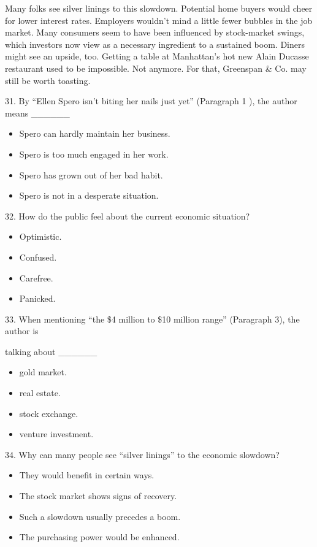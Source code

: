 \documentclass[UTF8,11pt]{ctexart}
\begin{document}
Many folks see silver linings to this slowdown. Potential home buyers would cheer for lower interest rates. Employers wouldn’t mind a little fewer bubbles in the job market. Many consumers seem to have been influenced by stock-market swings, which investors now view as a necessary ingredient to a sustained boom. Diners might see an upside, too. Getting a table at Manhattan’s hot new Alain Ducasse restaurant used to be impossible. Not anymore. For that, Greenspan \& Co. may still be worth toasting.


31. By “Ellen Spero isn’t biting her nails just yet” (Paragraph 1 ), the author means \_\_\_\_\_\_


\begin{itemize}[leftmargin=2em,itemsep=.2em,topsep=.4em]\item[A.] Spero can hardly maintain her business.
\item[B.] Spero is too much engaged in her work.
\item[C.] Spero has grown out of her bad habit.
\item[D.] Spero is not in a desperate situation.
\end{itemize}

32. How do the public feel about the current economic situation?


\begin{itemize}[leftmargin=2em,itemsep=.2em,topsep=.4em]\item[A.] Optimistic.
\item[B.] Confused.
\item[C.] Carefree.
\item[D.] Panicked.
\end{itemize}

33. When mentioning “the \$4 million to \$10 million range” (Paragraph 3), the author is


talking about \_\_\_\_\_\_


\begin{itemize}[leftmargin=2em,itemsep=.2em,topsep=.4em]\item[A.] gold market.
\item[B.] real estate.
\item[C.] stock exchange.
\item[D.] venture investment.
\end{itemize}

34. Why can many people see “silver linings” to the economic slowdown?


\begin{itemize}[leftmargin=2em,itemsep=.2em,topsep=.4em]\item[A.] They would benefit in certain ways.
\item[B.] The stock market shows signs of recovery.
\item[C.] Such a slowdown usually precedes a boom.
\item[D.] The purchasing power would be enhanced.
\end{itemize}
\end{document}
